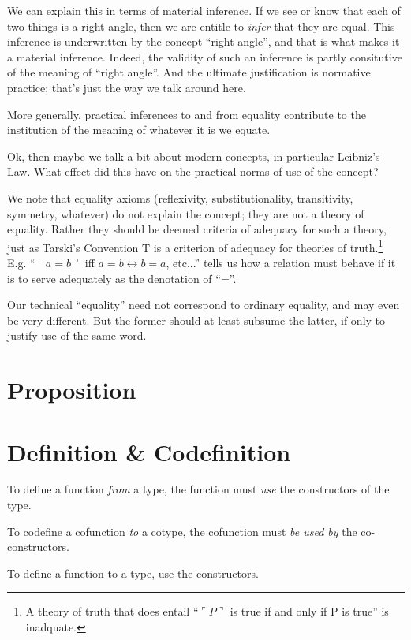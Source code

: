 \documentclass{article}
\begin{document}
We can explain this in terms of material inference. If we see or know
that each of two things is a right angle, then we are entitle to
\textit{infer} that they are equal. This inference is underwritten by
the concept ``right angle'', and that is what makes it a material
inference. Indeed, the validity of such an inference is partly
consitutive of the meaning of ``right angle''. And the ultimate
justification is normative practice; that's just the way we talk
around here.

More generally, practical inferences to and from equality contribute
to the institution of the meaning of whatever it is we equate.

Ok, then maybe we talk a bit about modern concepts, in particular
Leibniz's Law. What effect did this have on the practical norms of use
of the concept?

We note that equality axioms (reflexivity, substitutionality,
transitivity, symmetry, whatever) do not explain the concept; they are
not a theory of equality. Rather they should be deemed criteria of
adequacy for such a theory, just as Tarski's Convention T is a
criterion of adequacy for theories of truth.\footnote{A theory of
truth that does entail ``\(\ulcorner P\urcorner\) is true if and only
if P is true'' is inadquate.} E.g. ``\(\ulcorner a = b\urcorner\) iff
\(a=b ↔ b=a\), etc...'' tells us how a relation must behave if it is
to serve adequately as the denotation of ``=''.

Our technical ``equality'' need not correspond to ordinary equality,
and may even be very different. But the former should at least subsume
the latter, if only to justify use of the same word.

\section{Proposition}



\section{Definition \& Codefinition}

To define a function \textit{from} a type, the function must
\textit{use} the constructors of the type.

To codefine a cofunction \textit{to} a cotype, the cofunction must
\textit{be used by} the co-constructors.

To define a function to a type, use the constructors.
\end{document}
